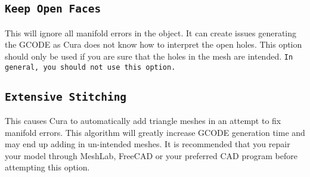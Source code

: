 \subsection{\texttt{Keep Open Faces}}
This will ignore all manifold errors in the object. It can create issues generating the GCODE as Cura does not know how to interpret the open holes. This option should only be used if you are sure that the holes in the mesh are intended. \texttt{In general, you should not use this option.}

\subsection{\texttt{Extensive Stitching}}
This causes Cura to automatically add triangle meshes in an attempt to fix manifold errors. This algorithm will greatly increase GCODE generation time and may end up adding in un-intended meshes. It is recommended that you repair your model through MeshLab, FreeCAD or your preferred CAD program before attempting this option.

